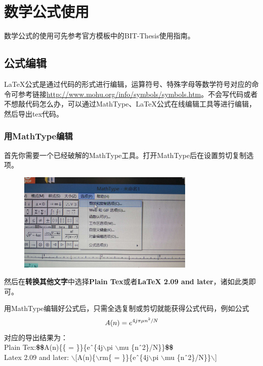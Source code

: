 \chapter{数学公式使用}
数学公式的使用可先参考官方模板中的BIT-Thesis使用指南。
\section{公式编辑}
LaTeX公式是通过代码的形式进行编辑，运算符号、特殊字母等数学符号对应的命令可参考链接\url{http://www.mohu.org/info/symbols/symbols.htm}。不会写代码或者不想敲代码怎么办，可以通过MathType、LaTeX公式在线编辑工具等进行编辑，然后导出tex代码。
\subsection{用MathType编辑}
首先你需要一个已经破解的MathType工具。打开MathType后在设置剪切复制选项。
\begin{figure}[h]
\centering
 \includegraphics[width=0.75\textwidth]{HelperSection/figures/mathtype_copy_type.jpg}
\end{figure}
然后在\textbf{转换其他文字}中选择\textbf{Plain Tex}或者\textbf{LaTeX 2.09 and later}，诸如此类即可。

用MathType编辑好公式后，只需全选复制或剪切就能获得公式代码，例如公式
\begin{equation}
A(n) = e^{4j\pi \mu n^2/N} \notag
\end{equation}
对应的导出结果为：\\
Plain Tex:\textbf{\$\$}A(n)\{\rm\{ = \}\}\{e\^\ \{4j$\backslash$pi $\backslash$mu \{n\^\ 2\}/N\}\}\textbf{\$\$} \\
Latex 2.09 and later: $\backslash$[A(n)\{$\backslash$rm\{ = \}\}\{e\^\ \{4j$\backslash$pi $\backslash$mu \{n\^\ 2\}/N\}\}$\backslash$]

